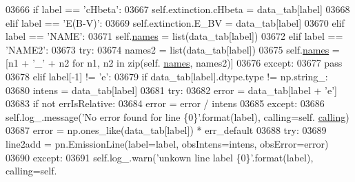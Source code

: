 \begin{DoxyCode}
03666                 \textcolor{keywordflow}{if} label == \textcolor{stringliteral}{'cHbeta'}:
03667                     self.extinction.cHbeta = data\_tab[label]
03668                 \textcolor{keywordflow}{elif} label == \textcolor{stringliteral}{'E(B-V)'}:
03669                     self.extinction.E\_BV = data\_tab[label]
03670                 \textcolor{keywordflow}{elif} label == \textcolor{stringliteral}{'NAME'}:
03671                     self.\hyperlink{classpyneb_1_1core_1_1pynebcore_1_1_observation_a3f365d0b1488b2eba300bf71caf23c17}{names} = list(data\_tab[label])
03672                 \textcolor{keywordflow}{elif} label == \textcolor{stringliteral}{'NAME2'}:
03673                     \textcolor{keywordflow}{try}:
03674                         names2 = list(data\_tab[label])
03675                         self.\hyperlink{classpyneb_1_1core_1_1pynebcore_1_1_observation_a3f365d0b1488b2eba300bf71caf23c17}{names} = [n1 + \textcolor{stringliteral}{'\_'} + n2 \textcolor{keywordflow}{for} n1, n2 \textcolor{keywordflow}{in} zip(self.
      \hyperlink{classpyneb_1_1core_1_1pynebcore_1_1_observation_a3f365d0b1488b2eba300bf71caf23c17}{names}, names2)]
03676                     \textcolor{keywordflow}{except}:
03677                         \textcolor{keywordflow}{pass}
03678                 \textcolor{keywordflow}{elif} label[-1] != \textcolor{stringliteral}{'e'}:
03679                     \textcolor{keywordflow}{if} data\_tab[label].dtype.type != np.string\_:
03680                         intens = data\_tab[label]
03681                         \textcolor{keywordflow}{try}:
03682                             error = data\_tab[label + \textcolor{stringliteral}{'e'}]
03683                             \textcolor{keywordflow}{if} \textcolor{keywordflow}{not} errIsRelative:
03684                                 error = error / intens
03685                         \textcolor{keywordflow}{except}:
03686                             self.log\_.message(\textcolor{stringliteral}{'No error found for line \{0\}'}.format(label), calling=self.
      \hyperlink{classpyneb_1_1core_1_1pynebcore_1_1_observation_a2639fad9af4fefad20e4097295bd40e7}{calling})
03687                             error = np.ones\_like(data\_tab[label]) * err\_default
03688                         \textcolor{keywordflow}{try}:
03689                             line2add = pn.EmissionLine(label=label, obsIntens=intens, obsError=error)
03690                         \textcolor{keywordflow}{except}:
03691                             self.log\_.warn(\textcolor{stringliteral}{'unkown line label \{0\}'}.format(label), calling=self.

\end{DoxyCode}
